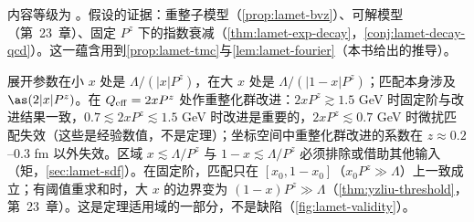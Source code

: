 内容等级为 \tagC。假设的证据：重整子模型（\cref{prop:lamet-bvz}）、可解模型（第~23~章）、固定 $P^z$ 下的指数衰减（\cref{thm:lamet-exp-decay}，\cref{conj:lamet-decay-qcd}）。这一蕴含用到\cref{prop:lamet-tmc}与\cref{lem:lamet-fourier}（本书给出的推导）。

\begin{remark}\label{rem:lamet-domain}
展开参数在小 $x$ 处是 $\Lambda/(|x|P^z)$，在大 $x$ 处是 $\Lambda/(|1-x|P^z)$；匹配本身涉及 $\as(2|x|P^z)$。在 $Q_{\rm eff}=2xP^z$ 处作重整化群改进\cite{Su:2022fiu}：$2xP^z\gtrsim1.5$ GeV 时固定阶与改进结果一致，$0.7\lesssim2xP^z\lesssim1.5$ GeV 时改进是重要的，$2xP^z\lesssim0.7$ GeV 时微扰匹配失效（这些是经验数值，不是定理）；坐标空间中重整化群改进的系数在 $z\approx0.2$--$0.3$ fm 以外失效。区域 $x\lesssim\Lambda/P^z$ 与 $1-x\lesssim\Lambda/P^z$ 必须排除或借助其他输入（矩，\cref{sec:lamet-sdf}）。在固定阶，匹配只在 $[x_0,1-x_0]$（$x_0P^z\gg\Lambda$）上一致成立；有阈值重求和时，大 $x$ 的边界变为 $(1-x)P^z\gg\Lambda$（\cref{thm:yzliu-threshold}，第~23~章）。这是定理适用域的一部分，不是缺陷（\cref{fig:lamet-validity}）。
\end{remark}

